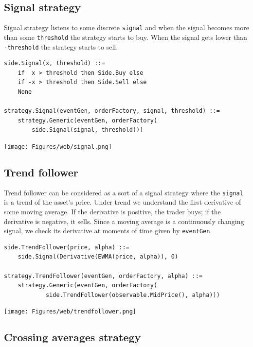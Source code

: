 \documentclass[a4paper,11pt]{article}
\begin{document}
\subsection{Signal strategy}\label{signal-strategy}

Signal strategy listens to some discrete \texttt{signal} and when the
signal becomes more than some \texttt{threshold} the strategy starts to
buy. When the signal gets lower than \texttt{-threshold} the strategy
starts to sell.

\begin{verbatim}
side.Signal(x, threshold) ::=
    if  x > threshold then Side.Buy else
    if -x > threshold then Side.Sell else
    None

strategy.Signal(eventGen, orderFactory, signal, threshold) ::=
    strategy.Generic(eventGen, orderFactory(
        side.Signal(signal, threshold)))
\end{verbatim}

\centerline{\texttt{[image: Figures/web/signal.png]}}

\subsection{Trend follower}\label{trend-follower}

Trend follower can be considered as a sort of a signal strategy where
the \texttt{signal} is a trend of the asset's price. Under trend we
understand the first derivative of some moving average. If the
derivative is positive, the trader buys; if the derivative is negative,
it sells. Since a moving average is a continuously changing signal, we
check its derivative at moments of time given by \texttt{eventGen}.

\begin{verbatim}
side.TrendFollower(price, alpha) ::=
    side.Signal(Derivative(EWMA(price, alpha)), 0)

strategy.TrendFollower(eventGen, orderFactory, alpha) ::=
    strategy.Generic(eventGen, orderFactory(
            side.TrendFollower(observable.MidPrice(), alpha)))
\end{verbatim}


\centerline{\texttt{[image: Figures/web/trendfollower.png]}}

\subsection{Crossing averages
strategy}\label{crossing-averages-strategy}
\end{document}
